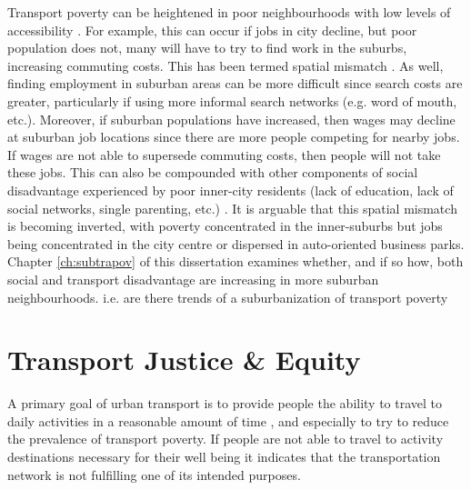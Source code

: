 Transport poverty can be heightened in poor neighbourhoods with low levels of accessibility \cite{lucas_is_2018, allen_sizing_2019}. For example, this can occur if jobs in city decline, but poor population does not, many will have to try to find work in the suburbs, increasing commuting costs. This has been termed spatial mismatch \cite{holzer_spatial_1991}. As well, finding employment in suburban areas can be more difficult since search costs are greater, particularly if using more informal search networks (e.g. word of mouth, etc.). Moreover, if suburban populations have increased, then wages may decline at suburban job locations since there are more people competing for nearby jobs. If wages are not able to supersede commuting costs, then people will not take these jobs. This can also be compounded with other components of social disadvantage experienced by poor inner-city residents (lack of education, lack of social networks, single parenting, etc.) \cite{holzer_spatial_1991}. It is arguable that this spatial mismatch is becoming inverted, with poverty concentrated in the inner-suburbs but jobs being concentrated in the city centre or dispersed in auto-oriented business parks. Chapter \ref{ch:subtrapov} of this dissertation examines whether, and if so how, both social and transport disadvantage are increasing in more suburban neighbourhoods. i.e. are there trends of a suburbanization of transport poverty







\section{Transport Justice \& Equity}


A primary goal of urban transport is to provide people the ability to travel to daily activities in a reasonable amount of time \cite{martens_transport_2016}, and especially to try to reduce the prevalence of transport poverty. If people are not able to travel to activity destinations necessary for their well being it indicates that the transportation network is not fulfilling one of its intended purposes. 

